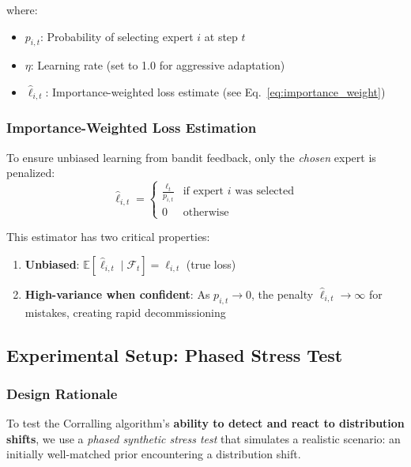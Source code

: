 where:
\begin{itemize}
    \item $p_{i,t}$: Probability of selecting expert $i$ at step $t$
    \item $\eta$: Learning rate (set to 1.0 for aggressive adaptation)
    \item $\hat{\ell}_{i,t}$: Importance-weighted loss estimate (see Eq.~\ref{eq:importance_weight})
\end{itemize}

\subsubsection{Importance-Weighted Loss Estimation}

To ensure unbiased learning from bandit feedback, only the \emph{chosen} expert is penalized:
\begin{equation}
\hat{\ell}_{i,t} = \begin{cases}
\frac{\ell_t}{p_{i,t}} & \text{if expert } i \text{ was selected} \\
0 & \text{otherwise}
\end{cases}
\label{eq:importance_weight}
\end{equation}

This estimator has two critical properties:
\begin{enumerate}
    \item \textbf{Unbiased}: $\mathbb{E}[\hat{\ell}_{i,t} \mid \mathcal{F}_t] = \ell_{i,t}$ (true loss)
    \item \textbf{High-variance when confident}: As $p_{i,t} \to 0$, the penalty $\hat{\ell}_{i,t} \to \infty$ for mistakes, creating rapid decommissioning
\end{enumerate}

\subsection{Experimental Setup: Phased Stress Test}

\subsubsection{Design Rationale}

To test the Corralling algorithm's \textbf{ability to detect and react to distribution shifts}, we use a \emph{phased synthetic stress test} that simulates a realistic scenario: an initially well-matched prior encountering a distribution shift.

